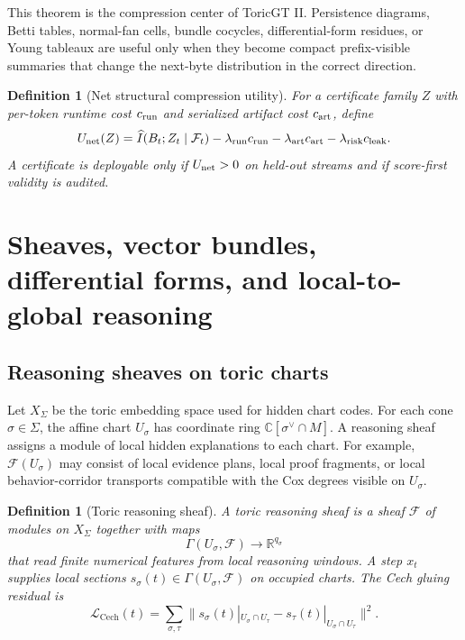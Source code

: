 \documentclass[10pt]{article}
\newtheorem{definition}[theorem]{Definition}
\newcommand{\RR}{\mathbb{R}}
\newcommand{\CC}{\mathbb{C}}
\newcommand{\calF}{\mathcal{F}}
\newcommand{\loss}{\mathcal{L}}
\numberwithin{equation}{section}
\begin{document}
This theorem is the compression center of ToricGT II. Persistence diagrams, Betti tables, normal-fan cells, bundle cocycles, differential-form residues, or Young tableaux are useful only when they become compact prefix-visible summaries that change the next-byte distribution in the correct direction.

\begin{definition}[Net structural compression utility]
For a certificate family $Z$ with per-token runtime cost $c_{\rm run}$ and serialized artifact cost $c_{\rm art}$, define
\begin{equation}
U_{\rm net}(Z)=\widehat I(B_t;Z_t\mid\mathcal F_t)-\lambda_{\rm run}c_{\rm run}-\lambda_{\rm art}c_{\rm art}-\lambda_{\rm risk}c_{\rm leak}.
\end{equation}
A certificate is deployable only if $U_{\rm net}>0$ on held-out streams and if score-first validity is audited.
\end{definition}

\section{Sheaves, vector bundles, differential forms, and local-to-global reasoning}
\subsection{Reasoning sheaves on toric charts}
Let $X_\Sigma$ be the toric embedding space used for hidden chart codes. For each cone $\sigma\in\Sigma$, the affine chart $U_\sigma$ has coordinate ring $\CC[\sigma^\vee\cap M]$. A reasoning sheaf assigns a module of local hidden explanations to each chart. For example, $\calF(U_\sigma)$ may consist of local evidence plans, local proof fragments, or local behavior-corridor transports compatible with the Cox degrees visible on $U_\sigma$.

\begin{definition}[Toric reasoning sheaf]
A toric reasoning sheaf is a sheaf $\calF$ of modules on $X_\Sigma$ together with maps
\begin{equation}
\Gamma(U_\sigma,\calF)\to \RR^{q_\sigma}
\end{equation}
that read finite numerical features from local reasoning windows. A step $x_t$ supplies local sections $s_\sigma(t)\in\Gamma(U_\sigma,\calF)$ on occupied charts. The Cech gluing residual is
\begin{equation}
\loss_{\mathrm{Cech}}(t)=\sum_{\sigma,\tau}\|s_\sigma(t)|_{U_\sigma\cap U_\tau}-s_\tau(t)|_{U_\sigma\cap U_\tau}\|^2.
\end{equation}
\end{definition}
\end{document}

